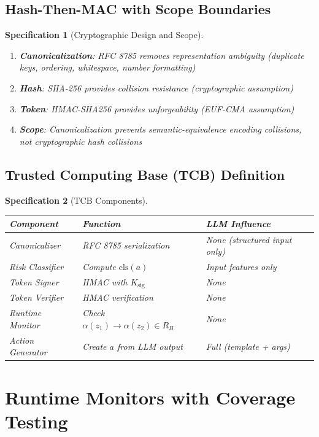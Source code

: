 \documentclass[12pt]{article}
\newtheorem{spec}{Specification}[section]
\begin{document}
\subsection{Hash-Then-MAC with Scope Boundaries}

\begin{spec}[Cryptographic Design and Scope]
\begin{enumerate}
    \item \textbf{Canonicalization}: RFC 8785 removes representation ambiguity (duplicate keys, ordering, whitespace, number formatting)
    \item \textbf{Hash}: SHA-256 provides collision resistance (cryptographic assumption)
    \item \textbf{Token}: HMAC-SHA256 provides unforgeability (EUF-CMA assumption)
    \item \textbf{Scope}: Canonicalization prevents \emph{semantic-equivalence encoding collisions}, not cryptographic hash collisions
\end{enumerate}
\end{spec}

\subsection{Trusted Computing Base (TCB) Definition}

\begin{spec}[TCB Components]
\begin{center}
\begin{tabular}{@{}p{}p{}p{}@{}}
\toprule
\textbf{Component} & \textbf{Function} & \textbf{LLM Influence} \\
\midrule
Canonicalizer & RFC 8785 serialization & None (structured input only) \\
Risk Classifier & Compute $\mathrm{cls}(a)$ & Input features only \\
Token Signer & HMAC with $K_{\text{sig}}$ & None \\
Token Verifier & HMAC verification & None \\
Runtime Monitor & Check $\alpha(z_1)\to\alpha(z_2) \in R_B$ & None \\
Action Generator & Create $a$ from LLM output & Full (template + args) \\
\bottomrule
\end{tabular}
\end{center}
\end{spec}

\section{Runtime Monitors with Coverage Testing}
\end{document}
